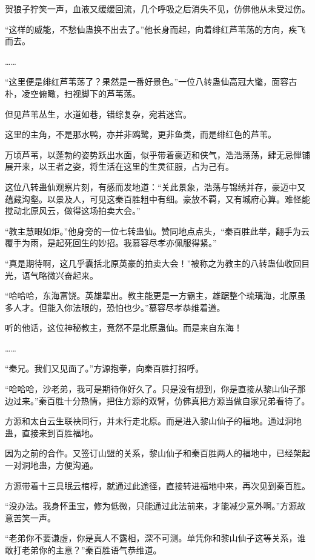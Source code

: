 \begin{this_body}
贺狼子狞笑一声，血液又缓缓回流，几个呼吸之后消失不见，仿佛他从未受过伤。

“这样的威能，不愁仙蛊换不出去了。”他长身而起，向着绯红芦苇荡的方向，疾飞而去。

……

“这里便是绯红芦苇荡了？果然是一番好景色。”一位八转蛊仙高冠大氅，面容古朴，凌空俯瞰，扫视脚下的芦苇荡。

但见芦苇丛生，水道如巷，错综复杂，宛若迷宫。

这里的主角，不是那水鸭，亦并非鸥鹭，更非鱼类，而是绯红色的芦苇。

万顷芦苇，以蓬勃的姿势跃出水面，似乎带着豪迈和侠气，浩浩荡荡，肆无忌惮铺展开来，以王者之姿，将生活在这里的生灵征服，占为己有。

这位八转蛊仙观察片刻，有感而发地道：“关此景象，浩荡与锦绣并存，豪迈中又蕴藏沟壑。以景及人，可见这秦百胜粗中有细。豪放不羁，又有城府心算。难怪能搅动北原风云，做得这场拍卖大会。”

“教主慧眼如炬。”他身旁的一位七转蛊仙。赞同地点点头，“秦百胜此举，翻手为云覆手为雨，是起死回生的妙招。我慕容尽孝亦佩服得紧。”

“真是期待啊，这几乎囊括北原英豪的拍卖大会！”被称之为教主的八转蛊仙收回目光，语气略微兴奋起来。

“哈哈哈，东海富饶。英雄辈出。教主能更是一方霸主，雄踞整个琉璃海，北原虽多人才。但能入你法眼的，恐怕也少。”慕容尽孝恭维着道。

听的他话，这位神秘教主，竟然不是北原蛊仙。而是来自东海！

……

“秦兄。我们又见面了。”方源抱拳，向秦百胜打招呼。

“哈哈哈，沙老弟，我可是期待你好久了。只是没有想到，你是直接从黎山仙子那边过来。”秦百胜十分热情，把住方源的双臂，仿佛真把方源当做自家兄弟看待了。

方源和太白云生联袂同行，并未行走北原。而是进入黎山仙子的福地。通过洞地蛊，直接来到百胜福地。

因为之前的合作。又签订山盟的关系，黎山仙子和秦百胜两人的福地中，已经架起一对洞地蛊，方便沟通。

方源带着十三具眠云棺椁，就通过此途径，直接转进福地中来，再次见到秦百胜。

“没办法。我身怀重宝，修为低微，只能通过此法前来，才能减少意外啊。”方源故意苦笑一声。

“老弟你不要谦虚，你是真人不露相，深不可测。单凭你和黎山仙子这等关系，谁敢打老弟你的主意？”秦百胜语气恭维道。


\end{this_body}
